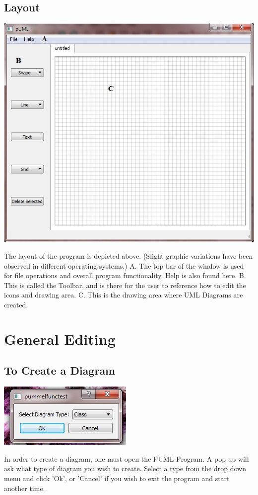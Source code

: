 \documentclass[]{article}
\begin{document}
\subsection{Layout}
{\color{black}
\includegraphics[scale = .60]{Layout}

The layout of the program is depicted above. (Slight graphic variations have been observed in different operating systems.) 
A. The top bar of the window is used for file operations and overall program functionality. Help is also found here.
B. This is called the Toolbar, and is there for the user to reference how to edit the icons and drawing area.
C. This is the drawing area where UML Diagrams are created. 
}

\section{General Editing}
\subsection{To Create a Diagram}
{\color{black}
\includegraphics[scale = .70]{StartMenu}

In order to create a diagram, one must open the PUML Program. A pop up will ask what type of diagram you wish to create. Select a type from the drop down menu and click 'Ok', or 'Cancel' if you wish to exit the program and start another time.
}
\end{document}
